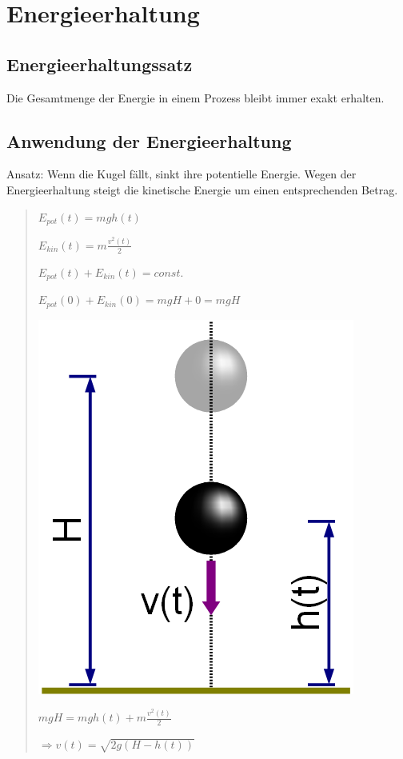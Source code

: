\section*{Energieerhaltung}


\subsection*{Energieerhaltungssatz}

Die Gesamtmenge der Energie in einem Prozess bleibt immer exakt erhalten.


\subsection*{Anwendung der Energieerhaltung}

Ansatz: Wenn die Kugel fällt, sinkt ihre potentielle Energie. Wegen
der Energieerhaltung steigt die kinetische Energie um einen entsprechenden
Betrag.
\begin{verse}
$E_{pot}(t)=mgh(t)$

$E_{kin}(t)=m\frac{v^{2}(t)}{2}$

$E_{pot}(t)+E_{kin}(t)=const.$

$E_{pot}(0)+E_{kin}(0)=mgH+0=mgH$

\includegraphics[scale=0.5]{Energie-Leistung-Potentiale/Energieerhaltung}

$mgH=mgh(t)+m\frac{v^{2}(t)}{2}$

$\Rightarrow v(t)=\sqrt{2g(H-h(t))}$
\end{verse}

